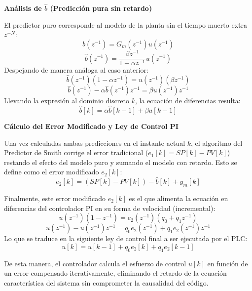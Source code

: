 \textbf{Análisis de $\hat{b}$ (Predicción pura sin retardo)}

El predictor puro corresponde al modelo de la planta sin el tiempo muerto extra $z^{-N}$:
\[
  \hat{b}(z^{-1}) = G_m(z^{-1})u(z^{-1})
\]
\[
  \hat{b}(z^{-1}) = \frac{\beta z^{-1}}{1 - \alpha z^{-1}}u(z^{-1})
\]
Despejando de manera análoga al caso anterior:
\[
  \hat{b}(z^{-1})(1 - \alpha z^{-1}) = u(z^{-1})(\beta z^{-1})
\]
\[
  \hat{b}(z^{-1}) - \alpha \hat{b}(z^{-1})z^{-1} = \beta u(z^{-1})z^{-1}
\]
Llevando la expresión al dominio discreto $k$, la ecuación de diferencias resulta:
\[
  \hat{b}[k] = \alpha \hat{b}[k-1] + \beta u[k-1]
\]

\textbf{Cálculo del Error Modificado y Ley de Control PI}

Una vez calculadas ambas predicciones en el instante actual $k$, el algoritmo del Predictor de Smith corrige el error tradicional ($e_1[k] = SP[k] - PV[k]$) restando el efecto del modelo puro y sumando el modelo con retardo. Esto se define como el error modificado $e_2[k]$:
\[
  e_2[k] = (SP[k] - PV[k]) - \hat{b}[k] + y_m[k]
\]

Finalmente, este error modificado $e_2[k]$ es el que alimenta la ecuación en diferencias del controlador PI en su forma de velocidad (incremental):
\[
  u(z^{-1})(1 - z^{-1}) = e_2(z^{-1})(q_0 + q_1z^{-1})
\]
\[
  u(z^{-1}) - u(z^{-1})z^{-1} = q_0 e_2(z^{-1}) + q_1 e_2(z^{-1})z^{-1}
\]
Lo que se traduce en la siguiente ley de control final a ser ejecutada por el PLC:
\[
  u[k] = u[k-1] + q_0 e_2[k] + q_1 e_2[k-1]
\]

De esta manera, el controlador calcula el esfuerzo de control $u[k]$ en función de un error compensado iterativamente, eliminando el retardo de la ecuación característica del sistema sin comprometer la causalidad del código.

